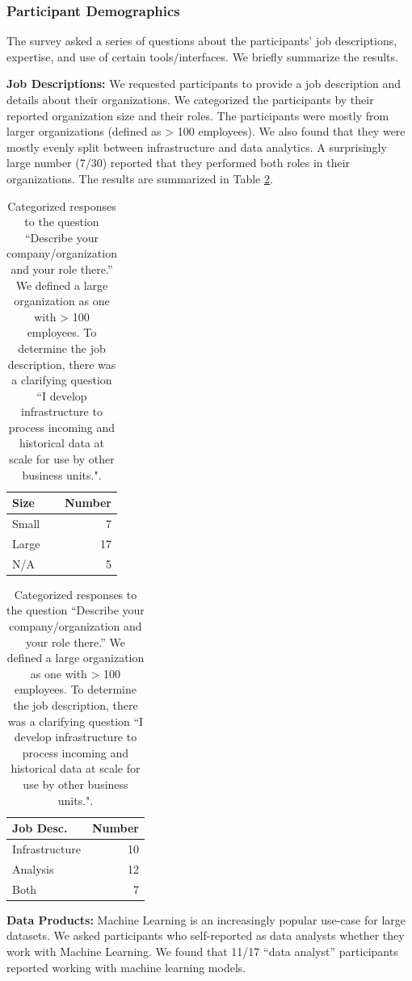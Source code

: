 \subsubsection{Participant Demographics}
The survey asked a series of questions about the participants' job descriptions, expertise, and use of certain tools/interfaces.
We briefly summarize the results.

\vspace{0.5em}

\noindent\textbf{Job Descriptions: } We requested participants to provide a job description and details about their organizations. We categorized the participants by their reported organization size and their roles. The participants were mostly from larger organizations (defined as > 100 employees). We also found that they were mostly evenly split between infrastructure and data analytics. A surprisingly large number (7/30) reported that they performed both roles in their organizations. The results are summarized in Table \ref{tab:jobs}. 

\begin{table}[t]
\centering
\begin{tabular}{|l|r|}
\hline
Size                               & Number \\
\hline
Small    & 7      \\
\hline
Large & 17     \\
\hline
N/A                                & 5\\  \hline  
\end{tabular}
\quad
\begin{tabular}{|l|r|}
\hline
Job Desc.                              & Number \\
\hline
Infrastructure    & 10      \\
\hline
Analysis & 12     \\
\hline
Both                                & 7\\  \hline  
\end{tabular}

\caption{Categorized responses to the question ``Describe your company/organization and your role there.'' We defined a large organization as one with > 100 employees. To determine the job description, there was a clarifying question ``I develop infrastructure to process incoming and historical data at scale for use by other business units.". \label{tab:jobs}}
\end{table}

\vspace{0.5em}
\noindent\textbf{Data Products: } Machine Learning is an increasingly popular use-case for large datasets. We asked participants who self-reported as data analysts whether they work with Machine Learning. We found that 11/17 ``data analyst'' participants reported working with machine learning models.

